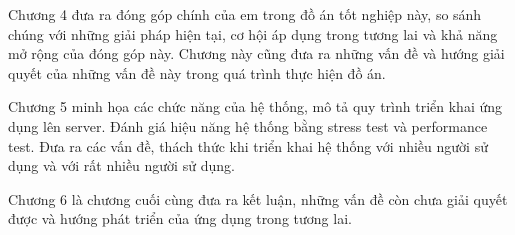 Chương 4 đưa ra đóng góp chính của em trong đồ án tốt nghiệp này,
so sánh chúng với những giải pháp hiện tại, cơ hội áp dụng trong
tương lai và khả năng mở rộng của đóng góp này. Chương này cũng
đưa ra những vấn đề và hướng giải quyết của những vấn đề này
trong quá trình thực hiện đồ án. 

Chương 5 minh họa các chức năng của hệ thống, mô tả quy trình
triển khai ứng dụng lên server. Đánh giá hiệu năng hệ thống bằng
stress test và performance test. Đưa ra các vấn đề, thách thức
khi triển khai hệ thống với nhiều người sử dụng và với rất
nhiều người sử dụng.

Chương 6 là chương cuối cùng đưa ra kết luận, những vấn đề còn
chưa giải quyết được và hướng phát triển của ứng dụng trong tương lai.

